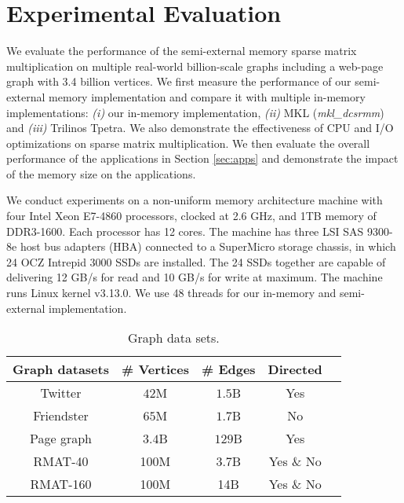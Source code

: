 \section{Experimental Evaluation}

We evaluate the performance of the semi-external memory sparse matrix
multiplication on multiple real-world billion-scale graphs including a web-page
graph with 3.4 billion vertices. We first measure the performance of our
semi-external memory implementation and compare it with multiple in-memory
implementations: \textit{(i)} our in-memory implementation, \textit{(ii)} MKL
(\textit{mkl\_dcsrmm}) and \textit{(iii)} Trilinos Tpetra. We also demonstrate
the effectiveness of
CPU and I/O optimizations on sparse matrix multiplication.
We then evaluate the overall performance of the applications in Section
\ref{sec:apps} and demonstrate the impact of the memory size on the applications.

We conduct experiments on a non-uniform memory architecture machine with
four Intel Xeon E7-4860 processors, clocked at 2.6 GHz, and 1TB memory of
DDR3-1600. Each processor has 12 cores. The machine has three LSI SAS 9300-8e
host bus adapters (HBA) connected to a SuperMicro storage chassis, in which
24 OCZ Intrepid 3000 SSDs are installed. The 24 SSDs together are capable of
delivering 12 GB/s for read and 10 GB/s for write at maximum. The machine runs
Linux kernel v3.13.0. We use 48 threads for our in-memory and semi-external
implementation.

\begin{table}
\begin{center}
\footnotesize
\begin{tabular}{|c|c|c|c|c|}
\hline
Graph datasets & \# Vertices & \# Edges & Directed \\
\hline
Twitter \cite{twitter} & $42$M & $1.5$B & Yes \\
\hline
Friendster \cite{friendster} & $65$M & $1.7$B & No \\
\hline
Page graph \cite{web_graph} & $3.4$B & $129$B & Yes \\
\hline
RMAT-40 \cite{rmat} & 100M & 3.7B & Yes \& No \\
\hline
RMAT-160 \cite{rmat} & 100M & 14B & Yes \& No \\
\hline
\end{tabular}
\normalsize
\end{center}
\caption{Graph data sets.}
\label{graphs}
\end{table}

